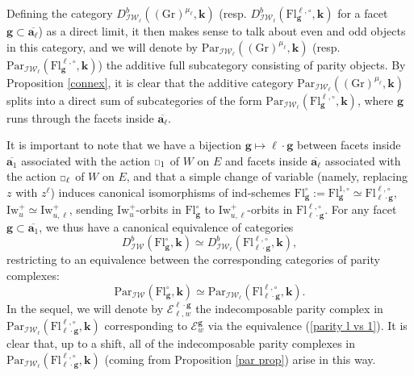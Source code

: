 \documentclass[11pt]{amsart}
\theoremstyle{plain}
\theoremstyle{remark}
\newcommand{\car}{\mbox{\relsize{-5}$\Box$}}
\numberwithin{equation}{section}
\begin{document}
	Defining the category $D^b_{\mathcal{IW}_\ell}((\mathrm{Gr})^{\mu_\ell},\mathbf{k})$ (resp. $D^b_{\mathcal{IW}_\ell}(\mathrm{Fl}^{\ell,\circ}_{\mathbf{g}},\mathbf{k})$ for a facet $\mathbf{g}\subset\overline{\mathbf{a}_\ell}$) as a direct limit, it then makes sense to talk about even and odd objects in this category, and we will denote by $\mathrm{Par}_{\mathcal{IW}_\ell}((\mathrm{Gr})^{\mu_\ell},\mathbf{k})$ (resp. $\mathrm{Par}_{\mathcal{IW}_\ell}(\mathrm{Fl}^{\ell,\circ}_{\mathbf{g}},\mathbf{k})$) the additive full subcategory consisting of parity objects. By Proposition \ref{connex}, it is clear that the additive category $\mathrm{Par}_{\mathcal{IW}_\ell}((\mathrm{Gr})^{\mu_\ell},\mathbf{k})$ splits into a direct sum of subcategories of the form $\mathrm{Par}_{\mathcal{IW}_\ell}(\mathrm{Fl}^{\ell,\circ}_{\mathbf{g}},\mathbf{k})$, where $\mathbf{g}$ runs through the facets inside $\overline{\mathbf{a}_\ell}$. 
	
	It is important to note that we have a bijection $\mathbf{g}\mapsto \ell\cdot\mathbf{g}$ between facets inside $\overline{\mathbf{a}_1}$ associated with the action $\car_1$ of $W$ on $E$ and facets inside $\overline{\mathbf{a}_\ell}$ associated with the action $\car_\ell$ of $W$ on $E$, and that a simple change of variable (namely, replacing $z$ with $z^\ell$) induces canonical isomorphisms of ind-schemes $\mathrm{Fl}^{\circ}_{\mathbf{g}}:=\mathrm{Fl}^{1,\circ}_{\mathbf{g}}\simeq \mathrm{Fl}^{\ell,\circ}_{\ell\cdot\mathbf{g}}$, $\mathrm{Iw}_{u}^+\simeq \mathrm{Iw}_{u,\ell}^+$, sending $\mathrm{Iw}_{u}^+$-orbits in $\mathrm{Fl}^{\circ}_{\mathbf{g}}$ to $\mathrm{Iw}_{u,\ell}^+$-orbits in $\mathrm{Fl}^{\ell,\circ}_{\ell\cdot\mathbf{g}}$. For any facet $\mathbf{g}\subset \overline{\mathbf{a}_1}$, we thus have a canonical equivalence of categories
	\begin{equation*}
		D^b_{\mathcal{IW}}(\mathrm{Fl}^{\circ}_{\mathbf{g}},\mathbf{k})\simeq D^b_{\mathcal{IW}_\ell}(\mathrm{Fl}^{\ell,\circ}_{\ell\cdot\mathbf{g}},\mathbf{k}),
	\end{equation*}
	restricting to an equivalence between the corresponding categories of parity complexes:
	\begin{equation}\label{parity l vs 1}
		\mathrm{Par}_{\mathcal{IW}}(\mathrm{Fl}^{\circ}_{\mathbf{g}},\mathbf{k})\simeq \mathrm{Par}_{\mathcal{IW}_\ell}(\mathrm{Fl}^{\ell,\circ}_{\ell\cdot\mathbf{g}},\mathbf{k}).
	\end{equation}
	In the sequel, we will denote by $\mathcal{E}_{\ell,w}^{\ell\cdot\mathbf{g}}$ the indecomposable parity complex in $\mathrm{Par}_{\mathcal{IW}_\ell}(\mathrm{Fl}^{\ell,\circ}_{\ell\cdot\mathbf{g}},\mathbf{k})$ corresponding to $\mathcal{E}^{\mathbf{g}}_w$ via the equivalence (\ref{parity l vs 1}). It is clear that, up to a shift, all of the indecomposable parity complexes in $\mathrm{Par}_{\mathcal{IW}_\ell}(\mathrm{Fl}^{\ell,\circ}_{\ell\cdot\mathbf{g}},\mathbf{k})$ (coming from Proposition \ref{par prop}) arise in this way.
	
\end{document}
